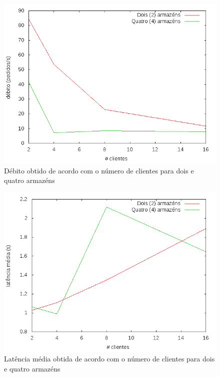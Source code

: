 \begin{figure}[!h]
\centering
\includegraphics[scale=.5]{img/questao-1/ser-deb}
\caption{Débito obtido de acordo com o número de clientes para dois e quatro armazéns}
\end{figure}

\begin{figure}[!h]
\centering
\includegraphics[scale=.5]{img/questao-1/ser-lat-med}
\caption{Latência média obtida de acordo com o número de clientes para dois e quatro armazéns}
\end{figure}

